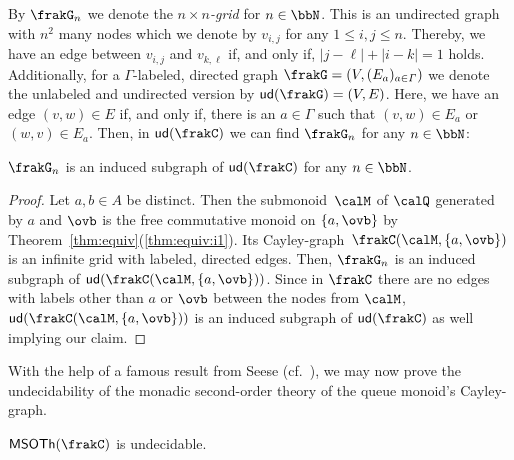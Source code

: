 By $\frakG_n$ we denote the \emph{$n\times n$-grid} for $n\in\bbN$. This is an undirected graph with $n^2$ many nodes which we denote by $v_{i,j}$ for any $1\leq i,j\leq n$. Thereby, we have an edge between $v_{i,j}$ and $v_{k,\ell}$ if, and only if, $|j-\ell|+|i-k|=1$ holds.
Additionally, for a $\varGamma$-labeled, directed graph $\frakG=(V,(E_a)_{a\in\varGamma})$ we denote the unlabeled and undirected version by $\ud{\frakG}=(V,E)$. Here, we have an edge $(v,w)\in E$ if, and only if, there is an $a\in\varGamma$ such that $(v,w)\in E_a$ or $(w,v)\in E_a$. Then, in $\ud{\cQ}$ we can find $\frakG_n$ for any $n\in\bbN$:

\begin{proposition}\label{prop:grid}
	$\frakG_n$ is an induced subgraph of $\ud{\cQ}$ for any $n\in\bbN$.
\end{proposition}
\begin{proof}
	Let $a,b\in A$ be distinct. Then the submonoid~$\calM$ of $\Qx$ generated by $a$ and $\ovb$ is the free commutative monoid on $\{a,\ovb\}$ by Theorem~\ref{thm:equiv}(\ref{thm:equiv:i1}). Its Cayley-graph~$\cayley{\calM}{\{a,\ovb\}}$ is an infinite grid with labeled, directed edges. %
	Then, $\frakG_n$ is an induced subgraph of $\ud{\cayley{\calM}{\{a,\ovb\}}}$. Since in $\cQ$ there are no edges with labels other than $a$ or $\ovb$ between the nodes from $\calM$, $\ud{\cayley{\calM}{\{a,\ovb\}}}$ is an induced subgraph of $\ud{\cQ}$ as well implying our claim.
\end{proof}

%		

With the help of a famous result from Seese (cf.~\cite{See91}), we may now prove the undecidability of the monadic second-order theory of the queue monoid's Cayley-graph.

\begin{corollary}
	$\MSOTh{\cQ}$ is undecidable.
\end{corollary}
